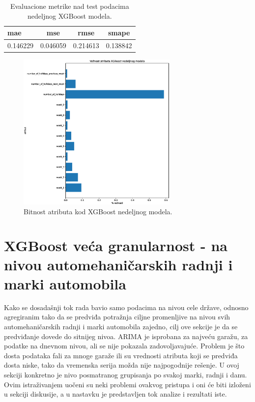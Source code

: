 \documentclass[12pt,oneside]{memoir}
\begin{document}
\begin{table}
\centering
\caption{Evaluacione metrike nad test podacima nedeljnog XGBoost modela.}
\label{tbl: xgboost_nedeljni_metrike}
\begin{tabular}{ |l|c|c|c|} 
\hline
mae & mse & rmse & smape\\
\hline
0.146229 & 0.046059 & 0.214613 & 0.138842\\
\hline
\end{tabular}
\end{table}
\begin{figure}[!ht]
  \centering
  \includegraphics[width=0.7\textwidth]{./grafici/xgboost_nedeljni_vaznost_atributa.eps}
  \caption{Bitnost atributa kod XGBoost nedeljnog modela.}
  \label{fig: xgboost_nedeljno_importance}
\end{figure}

\section{XGBoost veća granularnost - na nivou automehaničarskih radnji i marki automobila}
Kako se dosadašnji tok rada bavio samo podacima na nivou cele države, odnosno agregiranim tako da se predviđa potražnja ciljne promenljive na nivou svih automehaničarskih radnji i marki automobila zajedno, cilj ove sekcije je da se predviđanje dovede do sitnijeg nivoa. ARIMA je isprobana za najveću garažu, za podatke na dnevnom nivou, ali se nije pokazala zadovoljavajuće. Problem je što dosta podataka fali za mnoge garaže ili su vrednosti atributa koji se predviđa dosta niske, tako da vremenska serija možda nije najpogodnije rešenje. U ovoj sekciji konkretno je nivo posmatranog grupisanja po svakoj marki, radnji i danu. Ovim istraživanjem uočeni su neki problemi ovakvog pristupa i oni će biti izloženi u sekciji diskusije, a u nastavku je predstavljen tok analize i rezultati iste.
\end{document}
